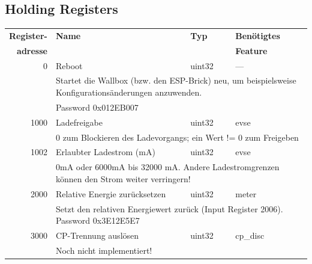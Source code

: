 \documentclass[a4paper,10pt]{article}
\newcommand{\tdesc}[1]{\multicolumn{3}{l}{\footnotesize #1}}
\begin{document}
\subsection{Holding Registers}
\begin{tabularx}{\textwidth}{rXll} \toprule
    \textbf{Register-} & \textbf{Name} & \textbf{Typ} & \textbf{Benötigtes}                                                     \\
    \textbf{adresse}   &      &     & \textbf{Feature}                                                                          \\ \midrule
0             & Reboot                                  & uint32       & ---                                                    \\
              & \tdesc{Startet die Wallbox (bzw. den ESP-Brick) neu, um beispielsweise Konfigurationsänderungen anzuwenden.}    \\
              & \tdesc{Password 0x012EB007}                                                                                     \\ \cmidrule{2-4}
1000          & Ladefreigabe                            & uint32       & evse                                                   \\
              & \tdesc{0 zum Blockieren des Ladevorgangs; ein Wert != 0 zum Freigeben}                                          \\ \cmidrule{2-4}
1002          & Erlaubter Ladestrom (mA)                & uint32       & evse                                                   \\
              & \tdesc{0mA oder 6000mA bis 32000 mA. Andere Ladestromgrenzen können den Strom weiter verringern!}               \\ \cmidrule{2-4}
2000          & Relative Energie zurücksetzen           & uint32       & meter                                                  \\
              & \tdesc{Setzt den relativen Energiewert zurück (Input Register 2006). Password 0x3E12E5E7}                       \\ \cmidrule{2-4}
3000          & CP-Trennung auslösen                    & uint32       & cp\_disc                                               \\
              & \tdesc{Noch nicht implementiert!}                                                                               \\ \bottomrule
\end{tabularx}
\end{document}
